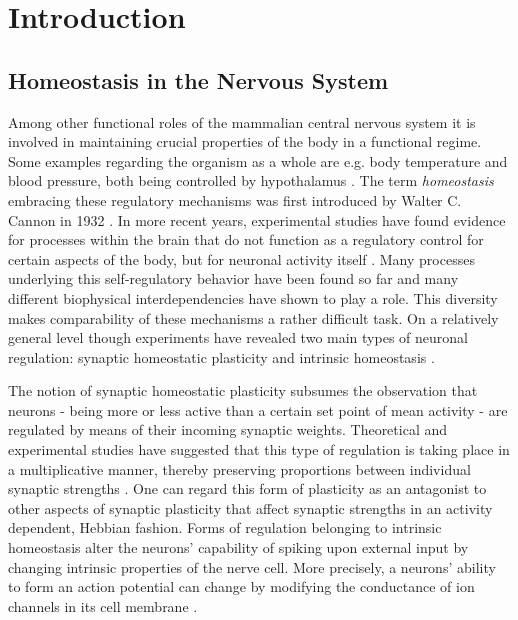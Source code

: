 \documentclass[10pt,a4paper]{article}
\begin{document}
\clearpage

\listoffigures

\clearpage

\listoftables

\clearpage

\mbox{}
\thispagestyle{empty}

\newpage

\section{Introduction}
\subsection{Homeostasis in the Nervous System}
Among other functional roles of the mammalian central nervous system it is involved in maintaining crucial properties of the body in a functional regime. Some examples regarding the organism as a whole are e.g. body temperature and blood pressure, both being controlled by hypothalamus \cite[p. 484]{Bear_Exploring_the_Brain}. The term \textit{homeostasis} embracing these regulatory mechanisms was first introduced by Walter C. Cannon in 1932 \cite{Wisdom_of_the_Body_Cannon, Homeostasis_Queenan_2012}. In more recent years, experimental studies have found evidence for processes within the brain that do not function as a regulatory control for certain aspects of the body, but for neuronal activity itself \cite{Turrigiano_1994,Burrone_2003}. Many processes underlying this self-regulatory behavior have been found so far and many different biophysical interdependencies have shown to play a role. This diversity makes comparability of these mechanisms a rather difficult task. On a relatively general level though experiments have revealed two main types of neuronal regulation: synaptic homeostatic plasticity and intrinsic homeostasis \cite{Desai_2003}. 

The notion of synaptic homeostatic plasticity subsumes the observation that neurons - being more or less active than a certain set point of mean activity - are regulated by means of their incoming synaptic weights. Theoretical and experimental studies have suggested that this type of regulation is taking place in a multiplicative manner, thereby preserving proportions between individual synaptic strengths \cite{Syn_Plast_Abbott}. One can regard this form of plasticity as an antagonist to other aspects of synaptic plasticity that affect synaptic strengths in an activity dependent, Hebbian fashion. Forms of regulation belonging to intrinsic homeostasis alter the neurons' capability of spiking upon external input by changing intrinsic properties of the nerve cell. More precisely, a neurons' ability to form an action potential can change by modifying the conductance of ion channels in its cell membrane \cite[p. 156]{Theor_Neur_Dayan}.
\end{document}
